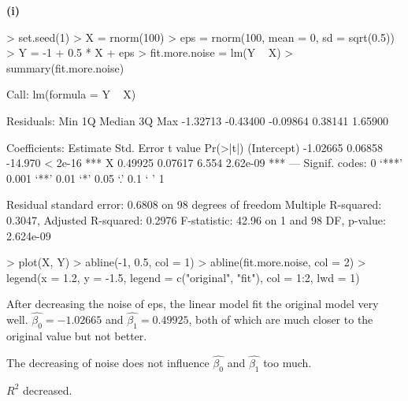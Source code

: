 \documentclass[a4paper]{article}
\renewcommand{\part}[1] {\vspace{.10in} {\bf (#1)}}
\begin{document}
\part{i}
\begin{Schunk}
\begin{Sinput}
> set.seed(1)
> X = rnorm(100)
> eps = rnorm(100, mean = 0, sd = sqrt(0.5))
> Y = -1 + 0.5 * X + eps
> fit.more.noise = lm(Y ~ X)
> summary(fit.more.noise)
\end{Sinput}
\begin{Soutput}
Call:
lm(formula = Y ~ X)

Residuals:
     Min       1Q   Median       3Q      Max 
-1.32713 -0.43400 -0.09864  0.38141  1.65900 

Coefficients:
            Estimate Std. Error t value Pr(>|t|)    
(Intercept) -1.02665    0.06858 -14.970  < 2e-16 ***
X            0.49925    0.07617   6.554 2.62e-09 ***
---
Signif. codes:  0 ‘***’ 0.001 ‘**’ 0.01 ‘*’ 0.05 ‘.’ 0.1 ‘ ’ 1

Residual standard error: 0.6808 on 98 degrees of freedom
Multiple R-squared:  0.3047,	Adjusted R-squared:  0.2976 
F-statistic: 42.96 on 1 and 98 DF,  p-value: 2.624e-09
\end{Soutput}
\begin{Sinput}
> plot(X, Y)
> abline(-1, 0.5, col = 1)
> abline(fit.more.noise, col = 2)
> legend(x = 1.2, y = -1.5, legend = c("original", "fit"), col = 1:2, lwd = 1)
\end{Sinput}
\end{Schunk}
\begin{enumerate}
{\color{red}
\item After decreasing the noise of eps, the linear model fit the original model very well. $\hat{\beta_0} = -1.02665$ and $\hat{\beta_1} = 0.49925$, both of which are much closer to the original value but not better.
\item The decreasing of noise does not influence $\hat{\beta_0}$ and $\hat{\beta_1}$ too much.
\item $R^2$ decreased.
}
\end{enumerate}
\end{document}
